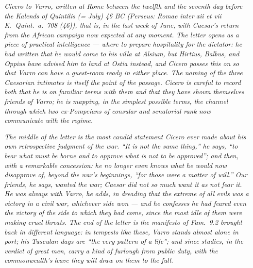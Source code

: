 
\textit{Cicero to Varro, written at Rome between the twelfth and
the seventh day before the Kalends of Quintilis (= July) 46 BC
(Perseus: \textit{Romae inter xii et vii K.~Quint.~a.~708 (46)}),
that is, in the last week of June, with Caesar's return from the
African campaign now expected at any moment. The letter opens as
a piece of practical intelligence --- where to prepare hospitality
for the dictator: he had written that he would come to his villa
at Alsium, but Hirtius, Balbus, and Oppius have advised him to
land at Ostia instead, and Cicero passes this on so that Varro can
have a guest-room ready in either place. The naming of the three
Caesarian intimates is itself the point of the passage. Cicero is
careful to record both that he is on familiar terms with them and
that they have shown themselves friends of Varro; he is mapping, in
the simplest possible terms, the channel through which two
ex-Pompeians of consular and senatorial rank now communicate with
the regime.}

\textit{The middle of the letter is the most candid statement
Cicero ever made about his own retrospective judgment of the war.
``It is not the same thing,'' he says, ``to bear what must be borne
and to approve what is not to be approved''; and then, with a
remarkable concession: he no longer even knows what he would now
disapprove of, beyond the war's beginnings, ``for those were a
matter of will.'' Our friends, he says, wanted the war; Caesar did
not so much want it as not fear it. He was always with Varro, he
adds, in dreading that the extreme of all evils was a victory in a
civil war, whichever side won --- and he confesses he had feared
even the victory of the side to which they had come, since the most
idle of them were making cruel threats. The end of the letter is
the manifesto of \textit{Fam.}~9.2 brought back in different
language: in tempests like these, Varro stands almost alone in
port; his Tusculan days are ``the very pattern of a life''; and
since studies, in the verdict of great men, carry a kind of
furlough from public duty, with the commonwealth's leave they will
draw on them to the full.}
